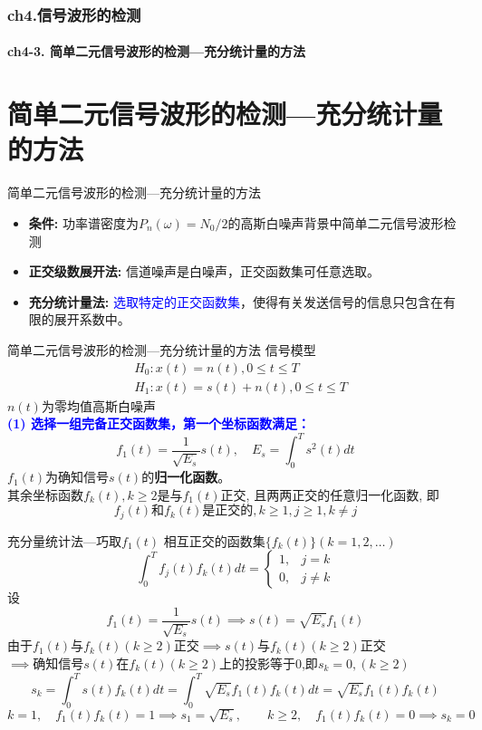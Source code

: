 \begin{frame}[shrink]
  \frametitle{ch4.信号波形的检测}
  \framesubtitle{ch4-3. 简单二元信号波形的检测---充分统计量的方法}
  \tableofcontents[hideallsubsections]
\end{frame}

\section{简单二元信号波形的检测---充分统计量的方法}

\begin{frame}{简单二元信号波形的检测---充分统计量的方法}
\begin{itemize}
	\setlength{\itemsep}{.5cm}
	\item \textbf{条件: }功率谱密度为$P_n(\omega)=N_0/2$的高斯白噪声背景中简单二元信号波形检测
	\item \textbf{正交级数展开法: }信道噪声是白噪声，正交函数集可任意选取。
	\item \textbf{充分统计量法: }\textcolor{blue}{选取特定的正交函数集}，使得有关发送信号的信息只包含在有限的展开系数中。	
\end{itemize}
\end{frame}

\begin{frame}{简单二元信号波形的检测---充分统计量的方法}
信号模型
\begin{align*}
&H_0: x(t)=n(t), 0\le t\le T\\
&H_1: x(t)=s(t)+n(t), 0\le t\le T
\end{align*}
$n(t)$为零均值高斯白噪声\\
\textbf{\textcolor{blue}{(1) 选择一组完备正交函数集，第一个坐标函数满足：}}
\[f_1(t)=\frac{1}{\sqrt{E_s}}s(t), \quad E_s=\int_{0}^{T}s^2(t)dt\]
$f_1(t)$为确知信号$s(t)$的\textbf{归一化函数}。\\
其余坐标函数$f_k(t), k\ge 2$是与$f_1(t)$正交, 且两两正交的任意归一化函数, 即
\[f_j(t)\text{和}f_k(t)\text{是正交的}, k\ge 1, j\ge 1, k\ne j \]
\end{frame}

\begin{frame}[shrink]{充分量统计法---巧取$f_1(t)$}
相互正交的函数集$\{f_k(t)\}(k=1,2,\dots)$
\[
\int_{0}^{T}f_j(t)f_k(t)dt=
\begin{cases}
1,&j=k\\
0,&j\ne k
\end{cases}
\]
设
\[ f_1(t)=\frac{1}{\sqrt{E_s}}s(t)\implies s(t)=\sqrt{E_s}f_1(t) \]
由于$f_1(t)$与$f_k(t)(k\ge 2)$正交$\implies s(t)$与$f_k(t)(k\ge 2)$正交\\
$\implies$确知信号$s(t)$在$f_k(t)(k\ge 2)$上的投影等于0,即$s_k=0,(k\ge 2)$\\
\[s_k=\int_{0}^{T}s(t)f_k(t)dt=\int_{0}^{T}\sqrt{E_s}f_1(t)f_k(t)dt=\sqrt{E_s}f_1(t)f_k(t) \]
$k=1,\quad f_1(t)f_k(t)=1\implies s_1=\sqrt{E_s},\qquad k\ge 2,\quad f_1(t)f_k(t)=0\implies s_k=0$\\
\end{frame}

